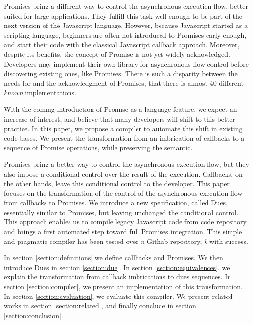 Promises bring a different way to control the asynchronous execution flow, better suited for large applications.
They fulfill this task well enough to be part of the next version of the Javascript language.
However, because Javascript started as a scripting language, beginners are often not introduced to Promises early enough, and start their code with the classical Javascript callback approach.
Moreover, despite its benefits, the concept of Promise is not yet widely acknowledged.
Developers may implement their own library for asynchronous flow control before discovering existing ones, like Promises.
There is such a disparity between the needs for and the acknowledgment of Promises, that there is almost 40 different \textit{known} implementations.

With the coming introduction of Promise as a language feature, we expect an increase of interest, and believe that many developers will shift to this better practice.
In this paper, we propose a compiler to automate this shift in existing code bases.
We present the transformation from an imbrication of callbacks to a sequence of Promise operations, while preserving the semantic.

Promises bring a better way to control the asynchronous execution flow, but they also impose a conditional control over the result of the execution.
Callbacks, on the other hands, leave this conditional control to the developer.
This paper focuses on the transformation of the control of the asynchronous execution flow from callbacks to Promises.
We introduce a new specification, called Dues, essentially similar to Promises, but leaving unchanged the conditional control.
This approach enables us to compile legacy Javascript code from code repository and brings a first automated step toward full Promises integration.
This simple and pragmatic compiler has been tested over \textit{n} Github repository, \textit{k} with success.

In section \ref{section:definitions} we define callbacks and Promises.
We then introduce Dues in section \ref{section:due}.
In section \ref{section:equivalences}, we explain the transformation from callback imbrications to dues sequences.
In section \ref{section:compiler}, we present an implementation of this transformation.
In section \ref{section:evaluation}, we evaluate this compiler.
We present related works in section \ref{section:related}, and finally conclude in section \ref{section:conclusion}.